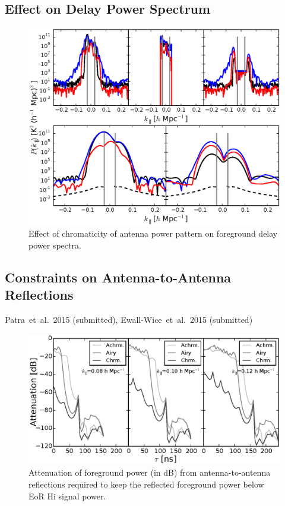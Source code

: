 \documentclass[preprint2,iop,numberedappendix,twocolappendix,appendixfloats]{emulateapj}
\begin{document}
\subsection{Effect on Delay Power Spectrum}

\begin{figure}[htb]
\centering
\includegraphics[width=\linewidth]{asm_beam_chromaticity_subband_150_MHz.eps}
\caption{Effect of chromaticity of antenna power pattern on foreground delay power spectra. }
\label{fig:asm-dps-beam-chromaticity}
\end{figure}

\subsection{Constraints on Antenna-to-Antenna Reflections}

Patra~et~al.~2015 (submitted), Ewall-Wice~et~al.~2015 (submitted)

\begin{figure}[htb]
\centering
\includegraphics[width=\linewidth]{spec_on_foreground_reflected_power_21cmfast.eps}
\caption{Attenuation of foreground power (in dB) from antenna-to-antenna reflections required to keep the reflected foreground power below EoR H{\sc i} signal power.}
\label{fig:fg-reflections}
\end{figure}
\end{document}
